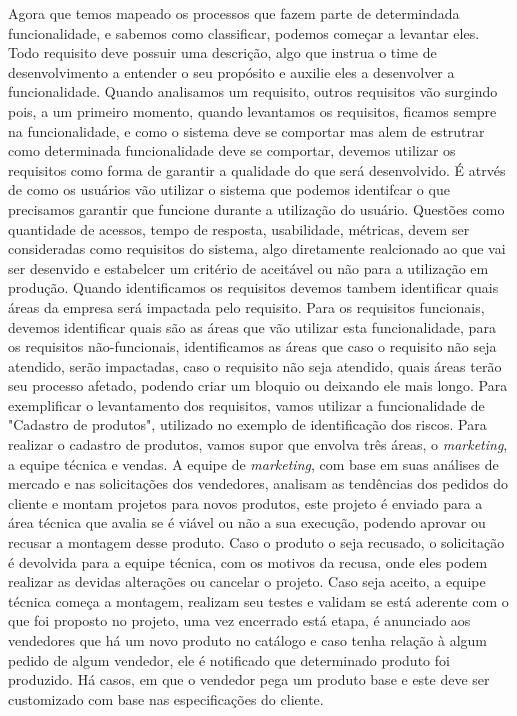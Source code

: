     Agora que temos mapeado os processos que fazem parte de determindada funcionalidade,
    e sabemos como classificar, podemos começar a levantar eles. Todo requisito
    deve possuir uma descrição, algo que instrua o time de desenvolvimento a entender
    o seu propósito e auxilie eles a desenvolver a funcionalidade. Quando analisamos
    um requisito, outros requisitos vão surgindo pois, a um primeiro momento,
    quando levantamos os requisitos, ficamos sempre na funcionalidade, e como o
    sistema deve se comportar mas alem de estrutrar como determinada funcionalidade
    deve se comportar, devemos utilizar os requisitos como forma de garantir a
    qualidade do que será desenvolvido. É atrvés de como os usuários vão utilizar
    o sistema que podemos identifcar o que precisamos garantir que funcione durante
    a utilização do usuário. Questões como quantidade de acessos, tempo de resposta,
    usabilidade, métricas, devem ser consideradas como requisitos do sistema, algo
    diretamente realcionado ao que vai ser desenvido e estabelcer um critério de
    aceitável ou não para a utilização em produção. Quando identificamos os requisitos
    devemos tambem identificar quais áreas da empresa será impactada pelo requisito.
    Para os requisitos funcionais, devemos identificar quais são as áreas que vão
    utilizar esta funcionalidade, para os requisitos não-funcionais, identificamos
    as áreas que caso o requisito não seja atendido, serão impactadas, caso o
    requisito não seja atendido, quais áreas terão seu processo afetado, podendo
    criar um bloquio ou deixando ele mais longo. Para exemplificar o levantamento
    dos requisitos, vamos utilizar a funcionalidade de "Cadastro de produtos",
    utilizado no exemplo de identificação dos riscos. \newline
    Para realizar o cadastro de produtos, vamos supor que envolva três áreas, o
    \textit{marketing}, a equipe técnica e vendas. A equipe de \textit{marketing},
    com base em suas análises de mercado e nas solicitações dos vendedores, analisam
    as tendências dos pedidos do cliente e montam projetos para novos produtos,
    este projeto é enviado para a área técnica que avalia se é viável ou não a
    sua execução, podendo aprovar ou recusar a montagem desse produto. Caso o
    produto o seja recusado, o solicitação é devolvida para a equipe técnica,
    com os motivos da recusa, onde eles podem realizar as devidas alterações ou
    cancelar o projeto. Caso seja aceito, a equipe técnica começa a montagem,
    realizam seu testes e validam se está aderente com o que foi proposto no
    projeto, uma vez encerrado está etapa, é anunciado aos vendedores que há um
    novo produto no catálogo e caso tenha relação à algum pedido de algum vendedor,
    ele é notificado que determinado produto foi produzido. Há casos, em que o
    vendedor pega um produto base e este deve ser customizado com base nas
    especificações do cliente. \newline

